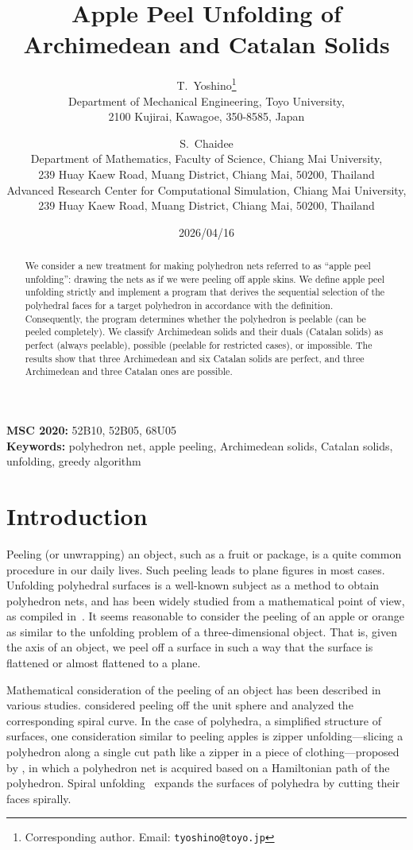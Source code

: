 \documentclass[12pt]{article}
\title{Apple Peel Unfolding of Archimedean and Catalan Solids}
\author{
  T.~Yoshino\thanks{Corresponding author.
    Email: \texttt{tyoshino@toyo.jp}}\\
  \small Department of Mechanical Engineering, Toyo University,\\
  \small 2100 Kujirai, Kawagoe, 350-8585, Japan
  \and
  S.~Chaidee\\
  \small Department of Mathematics, Faculty of Science,
         Chiang Mai University,\\
  \small 239 Huay Kaew Road, Muang District,
         Chiang Mai, 50200, Thailand\\
  \small Advanced Research Center for Computational Simulation,
         Chiang Mai University,\\
  \small 239 Huay Kaew Road, Muang District,
         Chiang Mai, 50200, Thailand
}
\date{2026/04/16}
\theoremstyle{plain}
\theoremstyle{definition}
\theoremstyle{remark}
\begin{document}
\maketitle

\noindent\textbf{MSC 2020:} 52B10, 52B05, 68U05\\
\noindent\textbf{Keywords:} polyhedron net, apple peeling, Archimedean solids,
Catalan solids, unfolding, greedy algorithm

\bigskip

\begin{abstract}
We consider a new treatment for making polyhedron nets referred to as
``apple peel unfolding'': drawing the nets as if we were peeling off apple
skins.
We define apple peel unfolding strictly and implement a program that
derives the sequential selection of the polyhedral faces for a target
polyhedron in accordance with the definition.
Consequently, the program determines whether the polyhedron is peelable
(can be peeled completely).
We classify Archimedean solids and their duals (Catalan solids) as
perfect (always peelable), possible (peelable for restricted cases),
or impossible.
The results show that three Archimedean and six Catalan solids are
perfect, and three Archimedean and three Catalan ones are possible.
\end{abstract}

\tableofcontents

\section{Introduction}\label{introduction}

Peeling (or unwrapping) an object, such as a fruit or package, is a
quite common procedure in our daily lives.
Such peeling leads to plane figures in most cases.
Unfolding polyhedral surfaces is a well-known subject as a method to
obtain polyhedron nets, and has been widely studied from a mathematical
point of view, as compiled in~\cite{Uehara2020}.
It seems reasonable to consider the peeling of an apple or orange as
similar to the unfolding problem of a three-dimensional object.
That is, given the axis of an object, we peel off a surface in such a
way that the surface is flattened or almost flattened to a plane.

Mathematical consideration of the peeling of an object has been described
in various studies.
\cite{Bartholdi2012} considered peeling off the unit sphere and analyzed
the corresponding spiral curve.
In the case of polyhedra, a simplified structure of surfaces,
one consideration similar to peeling apples is zipper unfolding---slicing
a polyhedron along a single cut path like a zipper in a piece of
clothing---proposed by \cite{Demaine2010}, in which a polyhedron net is
acquired based on a Hamiltonian path of the polyhedron.
Spiral unfolding~\cite{ORourke2015} expands the surfaces of polyhedra by
cutting their faces spirally.
\end{document}
